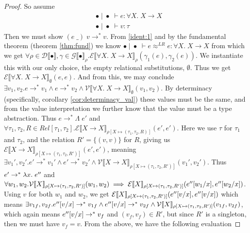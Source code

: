\documentclass[a4paper, 11pt]{report}
\theoremstyle{definition}
\newcommand{\var}{x}
\newcommand{\expr}{e}
\newcommand{\val}{v}
\newcommand{\valB}{w}
\newcommand{\Tvar}{X}
\newcommand{\Tlam}{\Lambda\;}
\newcommand{\Tapp}[1]{#1\;\_}
\newcommand{\subst}[3]{#1{\left[#3 \middle/ #2 \right]}}
\newcommand{\Tfunc}[2]{#1 \rightarrow #2}
\newcommand{\Tall}[2]{\forall #1.\; #2}
\newcommand{\typ}{\tau}
\newcommand{\emptenv}{\bullet}
\newcommand{\empvenv}{\bullet}
\newcommand{\jdg}[4]{#1 \; | \; #2 \; \vdash #3 : #4}
\newcommand{\jdgRel}[6]{#1 \; | \; #2 \; \vdash #3 \approx^{#4} #5 : #6}
\newcommand{\stepS}{\rightarrow^*}
\newcommand{\ValInp}[2]{\mathcal{V} \llbracket #1 \rrbracket_{#2}}
\newcommand{\ExpInp}[2]{\mathcal{E} \llbracket #1 \rrbracket_{#2}}
\newcommand{\VenvInp}[2]{\mathcal{G} \llbracket #1 \rrbracket_{#2}}
\newcommand{\TenvInp}[1]{\mathcal{D} \llbracket #1 \rrbracket}
\newcommand{\LogRel}[5]{\jdgRel{#1}{#2}{#3}{LR}{#4}{#5}}
\newcommand{\map}[2]{#1 \mapsto #2}
\begin{document}
\begin{proof}
  So assume
  \begin{align}
    &\jdg{\emptenv}{\empvenv}{\expr}{\Tall{\Tvar}{\Tfunc{\Tvar}{\Tvar}}}\label{ident:1}\\
    &\jdg{\emptenv}{\empvenv}{\val}{\typ}
  \end{align}
  Then we must show $(\Tapp{\expr}) \; \val \stepS \val$. From \ref*{ident:1} and by the fundamental theorem (theorem \ref{thm:fund}) we know $\LogRel{\emptenv}{\empvenv}{\expr}{\expr}{\Tall{\Tvar}{\Tfunc{\Tvar}{\Tvar}}}$ from which we get $\forall \rho \in \TenvInp{\emptenv}, \gamma \in \VenvInp{\empvenv}{\rho} . \ExpInp{\Tall{\Tvar}{\Tfunc{\Tvar}{\Tvar}}}{\rho}(\gamma_1(\expr), \gamma_2(\expr))$. We instantiate this with our only choice, the empty relational substitutions, $\emptyset$. Thus we get $\ExpInp{\Tall{\Tvar}{\Tfunc{\Tvar}{\Tvar}}}{\emptyset}(\expr, \expr)$. And from this, we may conclude $\exists \val_1, \val_2 . \expr \stepS \val_1 \land \expr \stepS \val_2 \land \ValInp{\Tall{\Tvar}{\Tfunc{\Tvar}{\Tvar}}}{\emptyset}(\val_1, \val_2)$. By determinacy (specifically, corollary \ref{cor:determinacy_val}) these values must be the same, and from the value interpretation we further know that the value must be a type abstraction. Thus $\expr \stepS \Tlam \expr'$ and $\forall \typ_1, \typ_2, R \in Rel[\typ_1, \typ_2] . \ExpInp{\Tfunc{\Tvar}{\Tvar}}{\rho[\map{\Tvar}{(\typ_1, \typ_2, R)}]}(\expr', \expr')$. Here we use $\typ$ for $\typ_1$ and $\typ_2$, and the relation $R' = \{(\val, \val)\}$ for $R$, giving us $\ExpInp{\Tfunc{\Tvar}{\Tvar}}{\rho[\map{\Tvar}{(\typ_1, \typ_2, R')}]}(\expr', \expr')$, meaning $\exists \val_1', \val_2' . \expr' \stepS \val_1' \land \expr' \stepS \val_2' \land \ValInp{\Tfunc{\Tvar}{\Tvar}}{\rho[\map{\Tvar}{(\typ_1, \typ_2, R')}]}(\val_1', \val_2')$. Thus $\expr' \stepS \fun \var . \expr''$ and $\forall \valB_1, \valB_2 . \ValInp{\Tvar}{\rho[\map{\Tvar}{(\typ_1, \typ_2, R')}]}(\valB_{1}, \valB_{2}) \implies \ExpInp{\Tvar}{\rho[\map{\Tvar}{(\typ_1, \typ_2, R')}]}(\subst{\expr''}{\var}{\valB_1}, \subst{\expr''}{\var}{\valB_2})$. Using $\val$ for both $\valB_1$ and $\valB_2$, we get $\ExpInp{\Tvar}{\rho[\map{\Tvar}{(\typ_1, \typ_2, R')}]}(\subst{\expr''}{\var}{\val}, \subst{\expr''}{\var}{\val})$ which means 
  $\exists \val_{1f}, \val_{2f} . \subst{\expr''}{\var}{\val} \stepS \val_{1f} \land \subst{\expr''}{\var}{\val} \stepS \val_{2f} \land \ValInp{\Tvar}{\rho[\map{\Tvar}{(\typ_1, \typ_2, R')}]}(\val_{1f}, \val_{2f})$, which again means $\subst{\expr''}{\var}{\val} \stepS \val_f$ and $(\val_f, \val_f) \in R'$, but since $R'$ is a singleton, then we must have $\val_f = \val$. From the above, we have the following evaluation

\end{proof}
\end{document}
